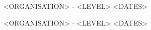 


\begin{cventries}

\cventry
{ <ORGANISATION> - <LEVEL>} %
{} %
{} %
{<DATES>} %
{ %
}
\vspace{-0.75cm}

\cventry
{ <ORGANISATION> - <LEVEL>} %
{} %
{} %
{<DATES>} %
{ %
}
\vspace{-0.75cm}





\end{cventries}